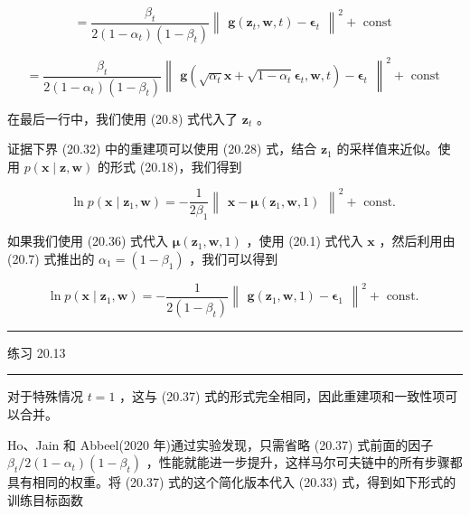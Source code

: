 \documentclass[10pt]{article}
\newcommand{\HRule}{\begin{center}\rule{0.9\linewidth}{0.2mm}\end{center}}
\begin{document}
\[
= \frac{{\beta }_{t}}{2\left( {1 - {\alpha }_{t}}\right) \left( {1 - {\beta }_{t}}\right) }{\begin{Vmatrix}\mathbf{g}\left( {\mathbf{z}}_{t},\mathbf{w},t\right)  - {\mathbf{\epsilon }}_{t}\end{Vmatrix}}^{2} + \text{ const }
\]

\[
= \frac{{\beta }_{t}}{2\left( {1 - {\alpha }_{t}}\right) \left( {1 - {\beta }_{t}}\right) }{\begin{Vmatrix}\mathbf{g}\left( \sqrt{{\alpha }_{t}}\mathbf{x} + \sqrt{1 - {\alpha }_{t}}{\mathbf{\epsilon }}_{t},\mathbf{w},t\right)  - {\mathbf{\epsilon }}_{t}\end{Vmatrix}}^{2} + \text{ const } \tag{20.37}
\]

在最后一行中，我们使用 (20.8) 式代入了 \({\mathbf{z}}_{t}\) 。

证据下界 (20.32) 中的重建项可以使用 (20.28) 式，结合 \({\mathbf{z}}_{1}\) 的采样值来近似。使用 \(p\left( {\mathbf{x} \mid  \mathbf{z},\mathbf{w}}\right)\) 的形式 (20.18)，我们得到

\[
\ln p\left( {\mathbf{x} \mid  {\mathbf{z}}_{1},\mathbf{w}}\right)  =  - \frac{1}{2{\beta }_{1}}{\begin{Vmatrix}\mathbf{x} - \mathbf{\mu }\left( {\mathbf{z}}_{1},\mathbf{w},1\right) \end{Vmatrix}}^{2} + \text{ const. } \tag{20.38}
\]

如果我们使用 (20.36) 式代入 \(\mathbf{\mu }\left( {{\mathbf{z}}_{1},\mathbf{w},1}\right)\) ，使用 (20.1) 式代入 \(\mathbf{x}\) ，然后利用由 (20.7) 式推出的 \({\alpha }_{1} = \left( {1 - {\beta }_{1}}\right)\) ，我们可以得到

\[
\ln p\left( {\mathbf{x} \mid  {\mathbf{z}}_{1},\mathbf{w}}\right)  =  - \frac{1}{2\left( {1 - {\beta }_{t}}\right) }{\begin{Vmatrix}\mathbf{g}\left( {\mathbf{z}}_{1},\mathbf{w},1\right)  - {\mathbf{\epsilon }}_{1}\end{Vmatrix}}^{2} + \text{ const. } \tag{20.39}
\]

\HRule

练习 20.13

\HRule

对于特殊情况 \(t = 1\) ，这与 (20.37) 式的形式完全相同，因此重建项和一致性项可以合并。

Ho、Jain 和 Abbeel(2020 年)通过实验发现，只需省略 (20.37) 式前面的因子 \({\beta }_{t}/2\left( {1 - {\alpha }_{t}}\right) \left( {1 - {\beta }_{t}}\right)\) ，性能就能进一步提升，这样马尔可夫链中的所有步骤都具有相同的权重。将 (20.37) 式的这个简化版本代入 (20.33) 式，得到如下形式的训练目标函数
\end{document}
